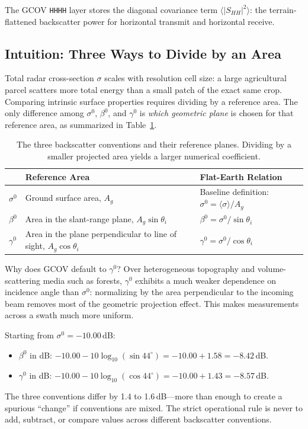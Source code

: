 \documentclass[11pt,a4paper]{article}
\begin{document}
The GCOV \texttt{HHHH} layer stores the diagonal covariance term $\langle |S_{HH}|^2 \rangle$: the terrain-flattened backscatter power for horizontal transmit and horizontal receive.

\subsection{Intuition: Three Ways to Divide by an Area}
\label{sec:tres-coef}

Total radar cross-section $\sigma$ scales with resolution cell size: a large agricultural parcel scatters more total energy than a small patch of the exact same crop. Comparing intrinsic surface properties requires dividing by a reference area. The only difference among $\sigma^0$, $\beta^0$, and $\gamma^0$ is \emph{which geometric plane} is chosen for that reference area, as summarized in Table~\ref{tab:areas-ref}.

\begin{table}[htbp]
\centering\small
\begin{tabularx}{\linewidth}{p{.1\linewidth}p{.38\linewidth}X}
\toprule
 & \textbf{Reference Area} & \textbf{Flat-Earth Relation}\\\midrule
$\sigma^0$ & Ground surface area, $A_g$ & Baseline definition: $\sigma^0=\langle\sigma\rangle/A_g$\\
$\beta^0$ & Area in the slant-range plane, $A_g\sin\theta_i$ & $\beta^0=\sigma^0/\sin\theta_i$\\
$\gamma^0$ & Area in the plane perpendicular to line of sight, $A_g\cos\theta_i$ &
$\gamma^0=\sigma^0/\cos\theta_i$\\\bottomrule
\end{tabularx}
\caption{The three backscatter conventions and their reference planes. Dividing by a smaller projected area yields a larger numerical coefficient.}
\label{tab:areas-ref}
\end{table}

Why does GCOV default to $\gamma^0$? Over heterogeneous topography and volume-scattering media such as forests, $\gamma^0$ exhibits a much weaker dependence on incidence angle than $\sigma^0$: normalizing by the area perpendicular to the incoming beam removes most of the geometric projection effect. This makes measurements across a swath much more uniform.

\begin{ejemplo}[Comparing the Three Conventions at $\theta_i = 44^\circ$ on Flat Terrain]
Starting from $\sigma^0=-10.00$\,dB:
\begin{itemize}
  \item $\beta^0$ in dB: $-10.00-10\log_{10}(\sin 44^\circ)=-10.00+1.58=-8.42$\,dB.
  \item $\gamma^0$ in dB: $-10.00-10\log_{10}(\cos 44^\circ)=-10.00+1.43=-8.57$\,dB.
\end{itemize}
The three conventions differ by 1.4 to 1.6\,dB---more than enough to create a spurious ``change'' if conventions are mixed. The strict operational rule is never to add, subtract, or compare values across different backscatter conventions.
\end{ejemplo}
\end{document}
